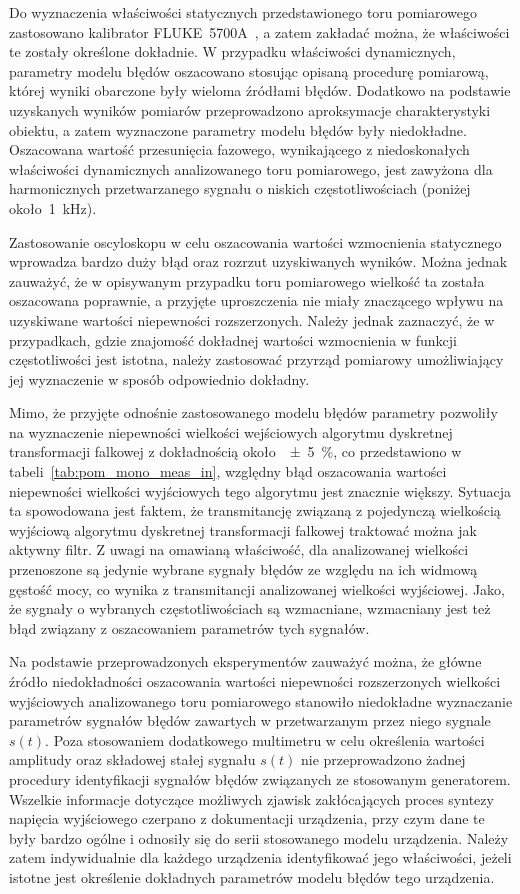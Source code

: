 Do wyznaczenia właściwości statycznych przedstawionego toru pomiarowego zastosowano kalibrator FLUKE~5700A~\cite{fluke_manual}, a zatem zakładać można, że właściwości te zostały określone dokładnie. W przypadku właściwości dynamicznych, parametry modelu błędów oszacowano stosując opisaną procedurę pomiarową, której wyniki obarczone były wieloma źródłami błędów. Dodatkowo na podstawie uzyskanych wyników pomiarów przeprowadzono aproksymacje charakterystyki obiektu, a zatem wyznaczone parametry modelu błędów były niedokładne. Oszacowana wartość przesunięcia fazowego, wynikającego z niedoskonałych właściwości dynamicznych analizowanego toru pomiarowego, jest zawyżona dla harmonicznych przetwarzanego sygnału o niskich częstotliwościach (poniżej około~\qty{1}{kHz}).

Zastosowanie oscyloskopu w celu oszacowania wartości wzmocnienia statycznego wprowadza bardzo duży błąd oraz rozrzut uzyskiwanych wyników. Można jednak zauważyć, że w opisywanym przypadku toru pomiarowego wielkość ta została oszacowana poprawnie, a przyjęte uproszczenia nie miały znaczącego wpływu na uzyskiwane wartości niepewności rozszerzonych. Należy jednak zaznaczyć, że w przypadkach, gdzie znajomość dokładnej wartości wzmocnienia w funkcji częstotliwości jest istotna, należy zastosować przyrząd pomiarowy umożliwiający jej wyznaczenie w sposób odpowiednio dokładny.

Mimo, że przyjęte odnośnie zastosowanego modelu błędów parametry pozwoliły na wyznaczenie niepewności wielkości wejściowych algorytmu dyskretnej transformacji falkowej z dokładnością około~\qty{\pm 5}{\percent}, co przedstawiono w tabeli~\ref{tab:pom_mono_meas_in}, względny błąd oszacowania wartości niepewności wielkości wyjściowych tego algorytmu jest znacznie większy. Sytuacja ta spowodowana jest faktem, że transmitancję związaną z pojedynczą wielkością wyjściową algorytmu dyskretnej transformacji falkowej traktować można jak aktywny filtr. Z uwagi na omawianą właściwość, dla analizowanej wielkości przenoszone są jedynie wybrane sygnały błędów ze względu na ich widmową gęstość mocy, co wynika z transmitancji analizowanej wielkości wyjściowej. Jako, że sygnały o wybranych częstotliwościach są wzmacniane, wzmacniany jest też błąd związany z oszacowaniem parametrów tych sygnałów.

Na podstawie przeprowadzonych eksperymentów zauważyć można, że główne źródło niedokładności oszacowania wartości niepewności rozszerzonych wielkości wyjściowych analizowanego toru pomiarowego stanowiło niedokładne wyznaczanie parametrów sygnałów błędów zawartych w przetwarzanym przez niego sygnale $s(t)$. Poza stosowaniem dodatkowego multimetru w celu określenia wartości amplitudy oraz składowej stałej sygnału $s(t)$ nie przeprowadzono żadnej procedury identyfikacji sygnałów błędów związanych ze stosowanym generatorem. Wszelkie informacje dotyczące możliwych zjawisk zakłócających proces syntezy napięcia wyjściowego czerpano z dokumentacji urządzenia, przy czym dane te były bardzo ogólne i odnosiły się do serii stosowanego modelu urządzenia. Należy zatem indywidualnie dla każdego urządzenia identyfikować jego właściwości, jeżeli istotne jest określenie dokładnych parametrów modelu błędów tego urządzenia.

